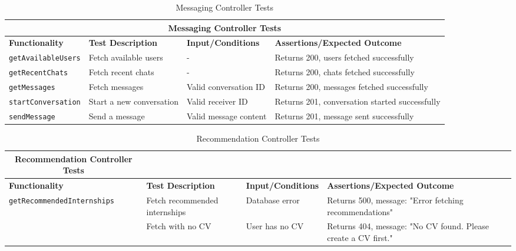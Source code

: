 \begin{table}[ht]
\centering
\begin{tabular}{|p{3.5cm}|p{4cm}|p{3.5cm}|p{5cm}|}
\hline
\multicolumn{4}{|c|}{\textbf{Messaging Controller Tests}} \\
\hline
\textbf{Functionality} & \textbf{Test Description} & \textbf{Input/Conditions} & \textbf{Assertions/Expected Outcome} \\
\hline
\texttt{getAvailableUsers} & Fetch available users & - & Returns 200, users fetched successfully \\
\hline
\texttt{getRecentChats} & Fetch recent chats & - & Returns 200, chats fetched successfully \\
\hline
\texttt{getMessages} & Fetch messages & Valid conversation ID & Returns 200, messages fetched successfully \\
\hline
\texttt{startConversation} & Start a new conversation & Valid receiver ID & Returns 201, conversation started successfully \\
\hline
\texttt{sendMessage} & Send a message & Valid message content & Returns 201, message sent successfully \\
\hline
\end{tabular}
\caption{Messaging Controller Tests}
\label{tab:messaging_controller_tests}
\end{table}

\begin{table}[ht]
\centering
\begin{tabular}{|p{4.8cm}|p{4cm}|p{3.5cm}|p{5cm}|}
\hline
\multicolumn{4.5}{|c|}{\textbf{Recommendation Controller Tests}} \\
\hline
\textbf{Functionality} & \textbf{Test Description} & \textbf{Input/Conditions} & \textbf{Assertions/Expected Outcome} \\
\hline
\multirow{2}{*}{\texttt{getRecommendedInternships}}
 & Fetch recommended internships     & Database error & Returns 500, message: "Error fetching recommendations" \\ \cline{2-4}
 & Fetch with no CV                 & User has no CV & Returns 404, message: "No CV found. Please create a CV first." \\
\hline
\end{tabular}
\caption{Recommendation Controller Tests}
\label{tab:recommendation_controller_tests}
\end{table}

